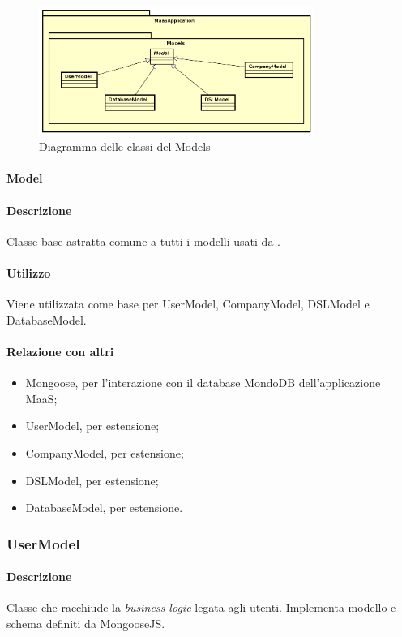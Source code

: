 \begin{figure}[H]
\centering
\includegraphics[width=0.8\textwidth]{res/sections/backend/models.png}
\caption{Diagramma delle classi del  Models}
\end{figure}

\paragraph{Model}
\paragraph*{Descrizione}
Classe base astratta comune a tutti i modelli usati da .

\paragraph*{Utilizzo}
Viene utilizzata come base per UserModel, CompanyModel, DSLModel e DatabaseModel.

\paragraph*{Relazione con altri }
\begin{itemize}
\item Mongoose, per l'interazione con il database MondoDB dell'applicazione MaaS;
\item UserModel, per estensione;
\item CompanyModel, per estensione;
\item DSLModel, per estensione;
\item DatabaseModel, per estensione.
\end{itemize}

\subsubsection{UserModel}
\paragraph*{Descrizione}
Classe che racchiude la \textit{business logic} legata agli utenti. Implementa modello e schema definiti da MongooseJS.

